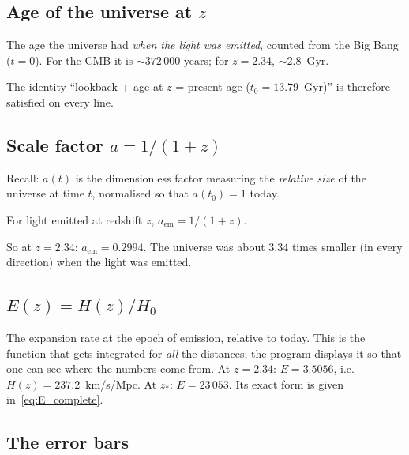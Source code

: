 \documentclass[11pt,a4paper,openany]{report}
\newcommand{\Hzero}{H_{0}}
\begin{document}
\subsection{Age of the universe at $z$}

\begin{tcolorbox}[gui]
The age the universe had \emph{when the light was emitted}, counted from the
Big Bang ($t=0$). For the CMB it is $\sim 372\,000$ years; for $z=2.34$,
$\sim 2.8$~Gyr.

\medskip
The identity “lookback + age at $z$ = present age ($t_0 = 13.79$~Gyr)” is
therefore satisfied on every line.
\end{tcolorbox}

\subsection{Scale factor $a = 1/(1+z)$}

\begin{tcolorbox}[gui]
Recall: $a(t)$ is the dimensionless factor measuring the \emph{relative size}
of the universe at time $t$, normalised so that $a(t_0) = 1$ today.

\medskip
For light emitted at redshift $z$, $a_{\text{em}} = 1/(1+z)$.

\medskip
So at $z = 2.34$: $a_{\text{em}} = 0.2994$. The universe was about $3.34$ times
smaller (in every direction) when the light was emitted.
\end{tcolorbox}

\subsection{$E(z) = H(z)/\Hzero$}

\begin{tcolorbox}[gui]
The expansion rate at the epoch of emission, relative to today. This is the
function that gets integrated for \emph{all} the distances; the program
displays it so that one can see where the numbers come from. At $z=2.34$:
$E = 3.5056$, i.e. $H(z) = 237.2$~km/s/Mpc. At $z_{*}$: $E = 23\,053$.
Its exact form is given in~\eqref{eq:E_complete}.
\end{tcolorbox}

\subsection{The error bars}
\end{document}

